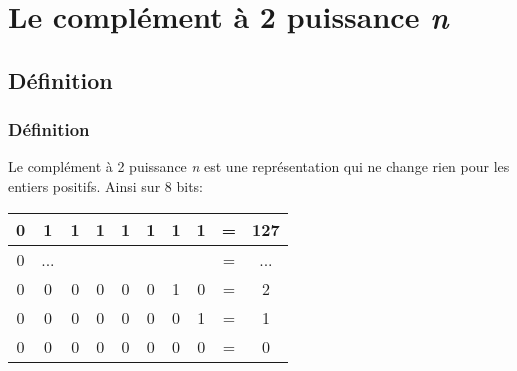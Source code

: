 \documentclass[svgnames,11pt]{beamer}
\begin{document}
\section{Le complément à 2 puissance \emph{n}}
\subsection{Définition}
\begin{frame}
    \frametitle{Définition}

    Le complément à 2 puissance \emph{n} est une représentation qui ne change rien pour les entiers positifs. Ainsi sur 8 bits:
    \begin{center}
        \begin{tabular}{|cccccccccc|}
            \hline
            0 & 1   & 1 & 1 & 1 & 1 & 1 & 1 & = & 127 \\
            \hline
            0 & ... &   &   &   &   &   &   & = & ... \\
            \hline
            0 & 0   & 0 & 0 & 0 & 0 & 1 & 0 & = & 2   \\
            \hline
            0 & 0   & 0 & 0 & 0 & 0 & 0 & 1 & = & 1   \\
            \hline
            0 & 0   & 0 & 0 & 0 & 0 & 0 & 0 & = & 0   \\
            \hline
        \end{tabular}
    \end{center}

\end{frame}
\end{document}
